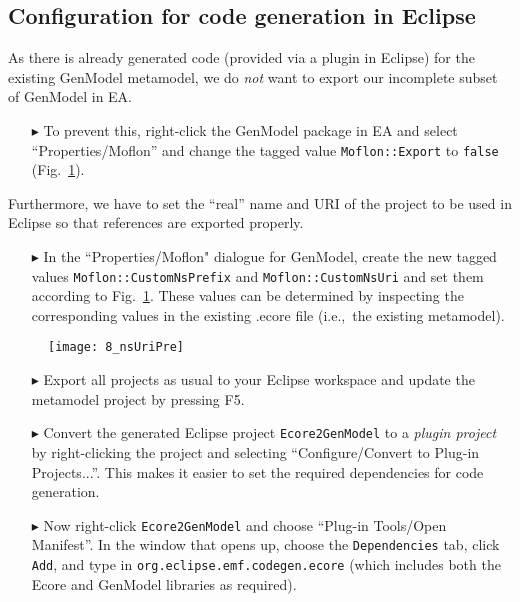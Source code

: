 \newpage

\subsection{Configuration for code generation in Eclipse}
\genHeader

As there is already generated code (provided via a plugin in Eclipse) for the existing \textsf{GenModel} metamodel, we do \emph{not} want to export our
incomplete subset of \textsf{GenModel} in EA.

\begin{enumerate}
\item[$\blacktriangleright$] To prevent this, right-click the \textsf{GenModel} package in EA and select ``Properties/Moflon'' and change the tagged value
\texttt{Moflon::Export} to \texttt{false} (Fig.~\ref{fig_customNS}).
\end{enumerate}

Furthermore, we have to set the ``real'' name and URI of the project to be used in Eclipse so that references are exported properly. 
\begin{enumerate}
\item[$\blacktriangleright$] In the ``Properties/Moflon" dialogue for \textsf{GenModel}, create the new tagged values \texttt{Moflon::CustomNsPrefix} and
\texttt{Moflon::CustomNsUri} and set them according to Fig.~\ref{fig_customNS}.
These values can be determined by inspecting the corresponding values in the existing .ecore file (i.e.,~the existing metamodel).
\end{enumerate}

\begin{figure}[htbp]
\begin{center}  \texttt{[image: 8\_nsUriPre]}
  \caption{}  
  \label{fig_customNS}
\end{center}
\end{figure}

\begin{enumerate}
\item[$\blacktriangleright$] Export all projects as usual to your Eclipse workspace and update the metamodel project by pressing \textsf{F5}.

\item[$\blacktriangleright$] Convert the generated Eclipse project \texttt{Ecore2GenModel} to a \emph{plugin project} by right-clicking the project and
selecting ``Configure/Convert to Plug-in Projects...''. This makes it easier to set the required dependencies for code generation.

\item[$\blacktriangleright$] Now right-click \texttt{Ecore2GenModel} and choose ``Plug-in Tools/Open Manifest''.
In the window that opens up, choose the \texttt{Dependencies} tab, click \texttt{Add}, and type in \texttt{org.eclipse.emf.codegen.ecore} (which includes both
the \textsf{Ecore} and \textsf{GenModel} libraries as required).
\end{enumerate}

